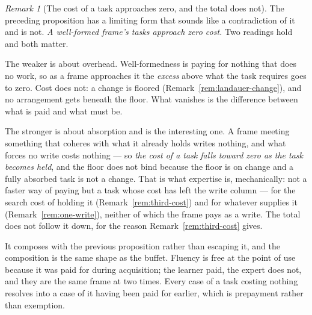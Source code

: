 \documentclass[11pt,a4paper]{article}
\theoremstyle{remark}\newtheorem{remark}[definition]{Remark}
\begin{document}
\begin{remark}[The cost of a task approaches zero, and the total does not]\label{rem:cost-to-zero}
The preceding proposition has a limiting form that sounds like a contradiction of it and is not. \emph{A well-formed frame's tasks approach zero cost.} Two readings hold and both matter.

The weaker is about overhead. Well-formedness is paying for nothing that does no work, so as a frame
approaches it the \emph{excess} above what the task requires goes to zero. Cost does not: a change is
floored (Remark~\ref{rem:landauer-change}), and no arrangement gets beneath the floor. What vanishes is
the difference between what is paid and what must be.

The stronger is about absorption and is the interesting one. A frame meeting something that coheres with
what it already holds writes nothing, and what forces no write costs nothing --- so \emph{the cost of a
task falls toward zero as the task becomes held}, and the floor does not bind because the floor is on
change and a fully absorbed task is not a change. That is what expertise is, mechanically: not a faster
way of paying but a task whose cost has left the write column --- for the search cost of holding it
(Remark~\ref{rem:third-cost}) and for whatever supplies it (Remark~\ref{rem:one-write}), neither of
which the frame pays as a write. The total does not follow it down, for the reason
Remark~\ref{rem:third-cost} gives.

It composes with the previous proposition rather than escaping it, and the composition is the same shape
as the buffet. Fluency is free at the point of use because it was paid for during acquisition; the
learner paid, the expert does not, and they are the same frame at two times. Every case of a task
costing nothing resolves into a case of it having been paid for earlier, which is prepayment rather than
exemption.
\end{remark}
\end{document}
